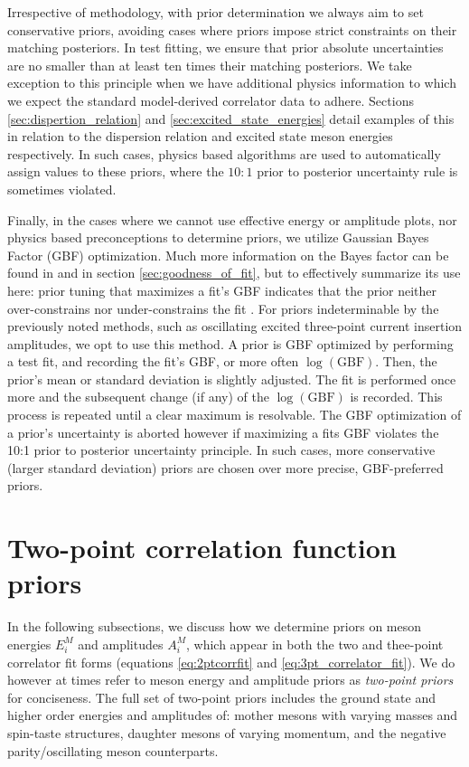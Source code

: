 Irrespective of methodology, with prior determination we always aim to set conservative priors, avoiding cases where priors impose strict constraints on their matching posteriors.  In test fitting, we ensure that prior absolute uncertainties are no smaller than at least ten times their matching posteriors.  We take exception to this principle when we have additional physics information to which we expect the standard model-derived correlator data to adhere.  Sections \ref{sec:dispertion_relation} and \ref{sec:excited_state_energies} detail examples of this in relation to the dispersion relation and excited state meson energies respectively.  In such cases, physics based algorithms are used to automatically assign values to these priors, where the $10:1$ prior to posterior uncertainty rule is sometimes violated.

Finally, in the cases where we cannot use effective energy or amplitude plots, nor physics based preconceptions to determine priors, we utilize Gaussian Bayes Factor (GBF) optimization. Much more information on the Bayes factor can be found in \cite{sivia2006data, carlin2010bayes} and in section \ref{sec:goodness_of_fit}, but to effectively summarize its use here: prior tuning that maximizes a fit's GBF indicates that the prior neither over-constrains nor under-constrains the fit \cite{bayes_Kass_Rafferty}.  For priors indeterminable by the previously noted methods, such as oscillating excited three-point current insertion amplitudes, we opt to use this method.  A prior is GBF optimized by performing a test fit, and recording the fit's GBF, or more often $\log(\mathrm{GBF})$.  Then, the prior's mean or standard deviation is slightly adjusted.  The fit is performed once more and the subsequent change (if any) of the $\log(\mathrm{GBF})$ is recorded.  This process is repeated until a clear maximum is resolvable. The GBF optimization of a prior's uncertainty is aborted however if maximizing a fits GBF violates the 10:1 prior to posterior uncertainty principle.  In such cases, more conservative (larger standard deviation) priors are chosen over more precise, GBF-preferred priors.  %


\section{Two-point correlation function priors}\label{sec:2pt_priors}
In the following subsections, we discuss how we determine priors on meson energies $E^M_i$ and amplitudes $A^M_i$, which appear in both the two and thee-point correlator fit forms (equations \ref{eq:2ptcorrfit} and \ref{eq:3pt_correlator_fit}).  We do however at times refer to meson energy and amplitude priors as \textit{two-point priors} for conciseness. The full set of two-point priors includes the ground state and higher order energies and amplitudes of: mother mesons with varying masses and spin-taste structures, daughter mesons of varying momentum, and the negative parity/oscillating meson counterparts.

